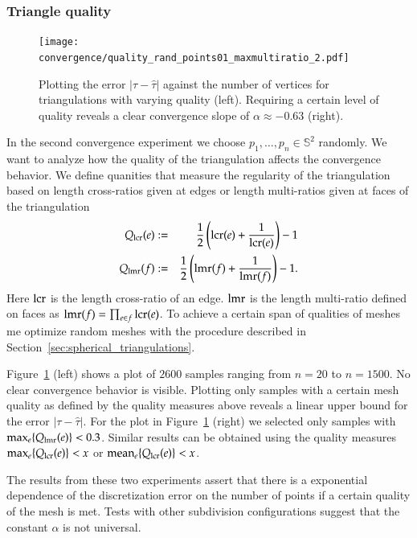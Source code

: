 \documentclass[Thesis]{subfiles}
\begin{document}
\subsubsection{Triangle quality}

\begin{figure}
\centering
\texttt{[image: convergence/quality\_rand\_points01\_maxmultiratio\_2.pdf]}
\caption{Plotting the error $|\tau - \hat\tau|$ against the number of vertices for triangulations with varying quality (left). Requiring a certain level of quality reveals a clear convergence slope of $\alpha\approx -0.63$ (right).}
\label{fig:convergence_quality}
\end{figure}

In the second convergence experiment we choose $p_1,\ldots,p_n\in \mathbb S^2$ randomly. 
We want to analyze how the quality of the triangulation affects the convergence behavior. 
We define quanities that measure the regularity of the triangulation based on length cross-ratios given at edges or length multi-ratios given at faces of the triangulation
\begin{eqnarray*}
	Q_{\operatorname{lcr}}(e) &:=& \frac{1}{2}\left(\operatorname{lcr}(e) + \frac{1}{\operatorname{lcr}(e)}\right) - 1\label{eq:quality_lcr}\\
	Q_{\operatorname{lmr}}(f) &:=& \frac{1}{2}\left(\operatorname{lmr}(f) + \frac{1}{\operatorname{lmr}(f)}\right) - 1\label{eq:quality_lmr}.
\end{eqnarray*}
Here $\operatorname{lcr}$ is the length cross-ratio of an edge. 
$\operatorname{lmr}$ is the length multi-ratio defined on faces as $\operatorname{lmr}(f)=\prod_{e \in f}\operatorname{lcr}(e)$.
To achieve a certain span of qualities of meshes me optimize random meshes with the procedure described in Section~\ref{sec:spherical_triangulations}.

Figure~\ref{fig:convergence_quality} (left) shows a plot of $2600$ samples ranging from $n=20$ to $n=1500$. 
No clear convergence behavior is visible. 
Plotting only samples with a certain mesh quality as defined by the quality measures above reveals a linear upper bound for the error $|\tau-\hat \tau|$. 
For the plot in Figure~\ref{fig:convergence_quality} (right) we selected only samples with $\max_e \{Q_{\operatorname{lmr}}(e)\} < 0.3$. 
Similar results can be obtained using the quality measures $\max_e \{Q_{\operatorname{lcr}}(e)\} < x$ or $\operatorname{mean}_e \{Q_{\operatorname{lcr}}(e)\} < x$.

The results from these two experiments assert that there is a exponential dependence of the discretization error on the number of points if a certain quality of the mesh is met. 
Tests with other subdivision configurations suggest that the constant $\alpha$ is not universal.
\end{document}
